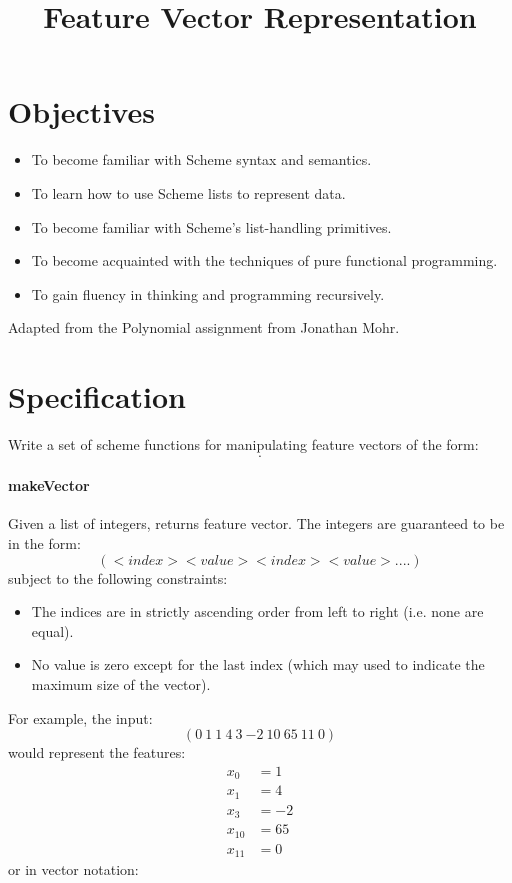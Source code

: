 \documentclass[12pt,info]{asg}
\title{Feature Vector Representation}
\begin{document}
\maketitle
\section*{Objectives}
\begin{itemize}
\item To become familiar with Scheme syntax and semantics.
\item To learn how to use Scheme lists to represent data.
\item To become familiar with Scheme's list-handling primitives.
\item To become acquainted with the techniques of pure functional programming.
\item To gain fluency in thinking and programming recursively.
\end{itemize}

Adapted from the Polynomial assignment from Jonathan Mohr.

\section*{Specification}
Write a set of scheme functions for manipulating feature vectors of the form:
\begin{equation}
[x_0, x_1, ... x_n].
\end{equation}

\paragraph{makeVector} Given a list of integers, returns feature vector. The integers are guaranteed to be in the form:
\begin{equation}
(<index><value><index><value>....)
\end{equation}
subject to the following constraints:
\begin{itemize}
\item The indices are in strictly ascending order from left to right (i.e. none are equal).
\item No value is zero except for the last index (which may used to indicate the maximum size of the vector).
\end{itemize}

For example, the input:
\begin{equation}
(0\ 1\  1\  4\  3\   {-2}\ 10\  65\  11\  0)
\end{equation}
would represent the features:
\begin{align*}
x_0 & = 1\\
x_1 & = 4\\
x_3 & = {-2}\\
x_{10} & = 65\\
x_{11} &= 0
\end{align*}
or in vector notation:
\begin{equation}
[1, 4, 0, {-2}, 0, 0, 0, 0, 0, 0, 65, 0]
\end{equation} 
\end{document}
